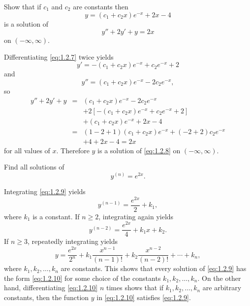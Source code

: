 \documentclass{ximera}
\begin{document}
\begin{example}\label{example:1.2.3}
 Show that if $c_1$ and $c_2$ are constants then
\begin{equation} \label{eq:1.2.7}
y=(c_1+c_2x)e^{-x}+2x-4
\end{equation}
 is a solution of
\begin{equation} \label{eq:1.2.8}
y''+2y'+y=2x
\end{equation}
 on $(-\infty,\infty)$.

\begin{explanation} 
Differentiating \eqref{eq:1.2.7} twice yields
$$
y'=-(c_1+c_2x)e^{-x}+c_2e^{-x}+2
$$
 and
$$
y''=(c_1+c_2x)e^{-x}-2c_2e^{-x},
$$
so
\begin{eqnarray*}
y''+2y'+y&=&(c_1+c_2x)e^{-x}-2c_2e^{-x}\\
&&+2\left[-(c_1+c_2x)e^{-x}+c_2e^{-x}+2\right]\\
&&+(c_1+c_2x)e^{-x}+2x-4\\
&=&(1-2+1)(c_1+c_2x)e^{-x}+(-2+2)c_2e^{-x}\\ &&+4+2x-4=2x
\end{eqnarray*}
for all values of $x$.
Therefore $y$ is a solution of \eqref{eq:1.2.8} on $(-\infty,\infty)$.
\end{explanation}
\end{example}

\begin{example}\label{example:1.2.4}
Find all solutions of
\begin{equation} \label{eq:1.2.9}
y^{(n)}=e^{2x}.
\end{equation}

\begin{explanation} Integrating \eqref{eq:1.2.9} yields
$$
y^{(n-1)}=\frac{e^{2x}}{2}+k_1,
$$
 where $k_1$ is a constant. If $n\geq 2$,
integrating again yields
$$
y^{(n-2)}=\frac{e^{2x}}{4}+k_1x+k_2.
$$
If $n\geq 3$, repeatedly integrating yields
\begin{equation} \label{eq:1.2.10}
y=\frac{e^{2x}}{2^n}+k_1\frac{x^{n-1}}{(n-1)!}+k_2\frac{x^{n-2}}{(n-2)!}+\cdots+k_n,
\end{equation}
 where $k_1, k_2, \dots, k_n$ are constants.
This shows that every solution of \eqref{eq:1.2.9} has the form
\eqref{eq:1.2.10}
for some choice of the constants $k_1, k_2, \dots, k_n$.
On the other hand, differentiating \eqref{eq:1.2.10}  $n$ times shows
that if
$k_1, k_2, \dots, k_n$ are arbitrary constants, then the function $y$
in
\eqref{eq:1.2.10} satisfies \eqref{eq:1.2.9}.
\end{explanation}
\end{example}
\end{document}
